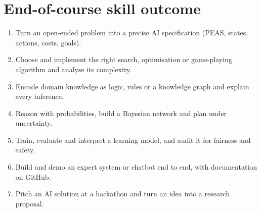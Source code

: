\documentclass[11pt]{article}
\begin{document}
\section*{End-of-course skill outcome}
\begin{outcome}\begin{enumerate}
\item Turn an open-ended problem into a precise AI specification (PEAS, states, actions, costs, goals).
\item Choose and implement the right search, optimisation or game-playing algorithm and analyse its complexity.
\item Encode domain knowledge as logic, rules or a knowledge graph and explain every inference.
\item Reason with probabilities, build a Bayesian network and plan under uncertainty.
\item Train, evaluate and interpret a learning model, and audit it for fairness and safety.
\item Build and demo an expert system or chatbot end to end, with documentation on GitHub.
\item Pitch an AI solution at a hackathon and turn an idea into a research proposal.
\end{enumerate}\end{outcome}
\end{document}
